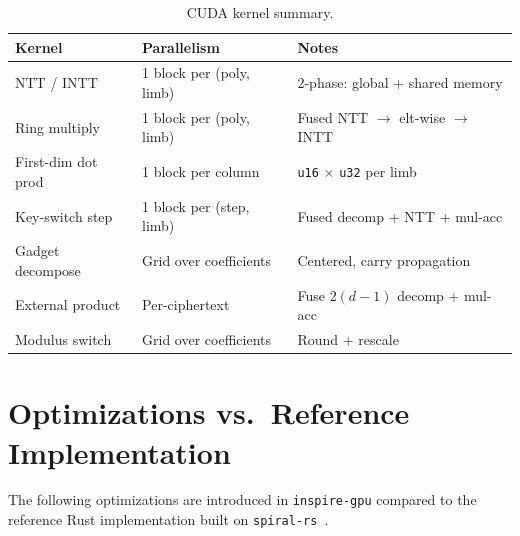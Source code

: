 \documentclass[11pt,a4paper]{article}
\begin{document}
\begin{table}[ht]\centering
\caption{CUDA kernel summary.}\label{tab:cuda}
\begin{tabular}{@{}lll@{}}
\toprule
\textbf{Kernel} & \textbf{Parallelism} & \textbf{Notes} \\
\midrule
NTT / INTT          & 1 block per (poly, limb) & 2-phase: global + shared memory \\
Ring multiply        & 1 block per (poly, limb) & Fused NTT $\to$ elt-wise $\to$ INTT \\
First-dim dot prod   & 1 block per column       & \texttt{u16} $\times$ \texttt{u32} per limb \\
Key-switch step      & 1 block per (step, limb) & Fused decomp + NTT + mul-acc \\
Gadget decompose     & Grid over coefficients   & Centered, carry propagation \\
External product     & Per-ciphertext           & Fuse $2(d\!-\!1)$ decomp + mul-acc \\
Modulus switch       & Grid over coefficients   & Round + rescale \\
\bottomrule
\end{tabular}
\end{table}

\section{Optimizations vs.\ Reference Implementation}\label{sec:optimizations}

The following optimizations are introduced in \texttt{inspire-gpu} compared to the reference Rust implementation built on \texttt{spiral-rs}~\cite{inspire2025,spiral}.
\end{document}
